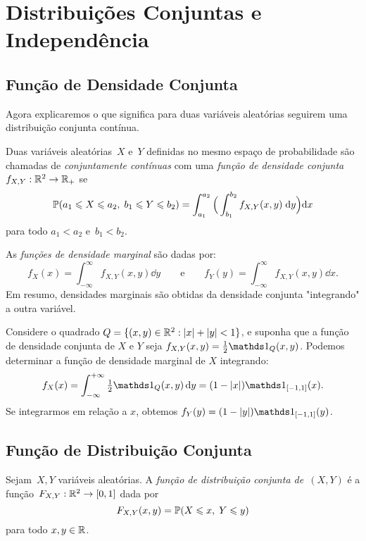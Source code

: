 


\clearpage
\section{Distribuições Conjuntas e Independência}

\subsection{Função de Densidade Conjunta}

Agora explicaremos o que significa para duas variáveis aleatórias seguirem uma distribuição conjunta contínua.

\begin{definition}
Duas variáveis aleatórias~$X$ e~$Y$ definidas no mesmo espaço de probabilidade são chamadas de \emph{conjuntamente contínuas} com uma \emph{função de densidade conjunta} $ f_{X,Y}:\mathbb{R}^2\to\mathbb{R}_+ $
se
\[
\mathbb{P}(a_1 \leqslant X \leqslant a_2,\; b_1 \leqslant  Y \leqslant  b_2)
= \int_{a_1}^{a_2}
\Big(
\int_{b_1}^{b_2} f_{X,Y}(x,y)\;\mathrm{d} y
\Big)
\mathrm{d} x
\]
para todo $a_1 < a_2$ e~$b_1 < b_2$.
\end{definition}

As \emph{funções de densidade marginal} são dadas por:
\[f_X(x) = \int_{-\infty}^\infty f_{X,Y}(x,y) \dd y\qquad \text{e}\qquad f_Y(y) = \int_{-\infty}^\infty f_{X,Y}(x,y) \dd x.\]
Em resumo, densidades marginais são obtidas da densidade conjunta "integrando" a outra variável.

\begin{example}
Considere o quadrado $ Q = \{(x,y) \in \mathbb{R}^2:|x|+|y|<1\} $, e suponha que a função de densidade conjunta de $ X $ e $ Y $ seja $ f_{X,Y}(x,y) = \frac{1}{2} \I_Q(x,y) $.
Podemos determinar a função de densidade marginal de $ X $ integrando:
\[
f_X(x) = \int_{-\infty}^{+\infty} \tfrac{1}{2} \I_Q(x,y) \, \dd y = (1-|x|) \I_{[-1,1]}(x).
\]
Se integrarmos em relação a $ x $, obtemos $ f_Y(y) = (1-|y|) \I_{[-1,1]}(y) $.
\end{example}

\subsection{Função de Distribuição Conjunta}

\begin{definition}
Sejam~$X,Y$ variáveis aleatórias.
A \emph{função de distribuição conjunta de~$(X,Y)$} é a função~$F_{X,Y}:\mathbb{R}^2 \to [0,1]$ dada por
\[
F_{X,Y}(x,y) = \mathbb{P}(X \leqslant x,\; Y \leqslant y)
\]
para todo $ x, y \in \mathbb{R} $.
\end{definition}

